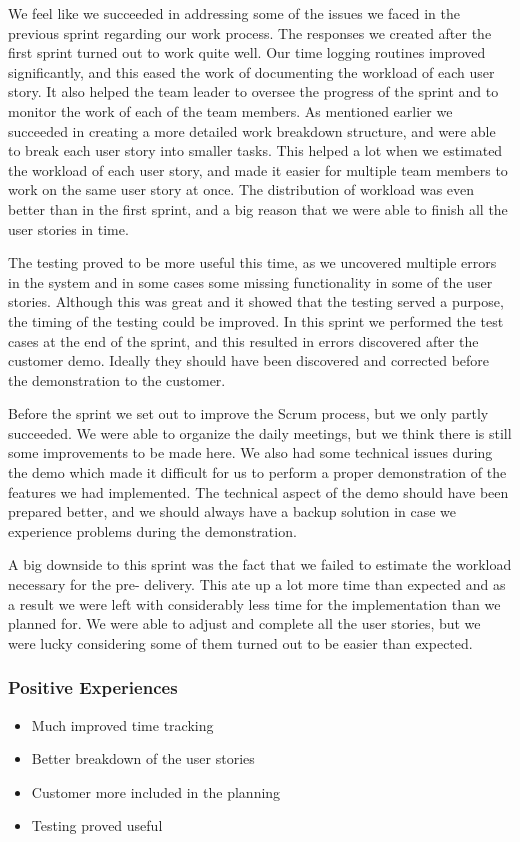 We feel like we succeeded in addressing some of the issues we faced in the previous sprint regarding our work process. The responses we created after the first sprint turned out to work quite well. Our time logging routines improved significantly, and this eased the work of documenting the workload of each user story. It also helped the team leader to oversee the progress of the sprint and to monitor the work of each of the team members. As mentioned earlier we succeeded in creating a more detailed work breakdown structure, and were able to break each user story into smaller tasks. This helped a lot when we estimated the workload of each user story, and made it easier for multiple team members to work on the same user story at once. The distribution of workload was even better than in the first sprint, and a big reason that we were able to finish all the user stories in time.

The testing proved to be more useful this time, as we uncovered multiple errors in the system and in some cases some missing functionality in some of the user stories. Although this was great and it showed that the testing served a purpose, the timing of the testing could be improved. In this sprint we performed the test cases at the end of the sprint, and this resulted in errors discovered after the customer demo. Ideally they should have been discovered and corrected before the demonstration to the customer.

Before the sprint we set out to improve the Scrum process, but we only partly succeeded. We were able to organize the daily meetings, but we think there is still some improvements to be made here. We also had some technical issues during the demo which made it difficult for us to perform a proper demonstration of the features we had implemented. The technical aspect of the demo should have been prepared better, and we should always have a backup solution in case we experience problems during the demonstration.

A big downside to this sprint was the fact that we failed to estimate the workload necessary for the pre- delivery. This ate up a lot more time than expected and as a result we were left with considerably less time for the implementation than we planned for. We were able to adjust and complete all the user stories, but we were lucky considering some of them turned out to be easier than expected.


\subsubsection{Positive Experiences}
\begin{itemize}
\item Much improved time tracking
\item Better breakdown of the user stories
\item Customer more included in the planning
\item Testing proved useful
\end{itemize}


